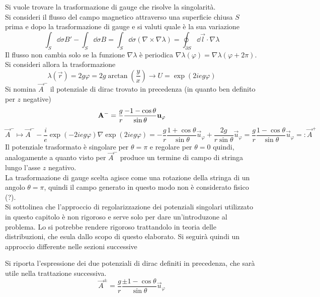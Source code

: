 Si vuole trovare la trasformazione di gauge che risolve la singolarità.\\

Si consideri il flusso del campo magnetico attraverso una superficie chiusa $S$
prima e dopo la trasformazione di gauge e si valuti quale è la sua variazione
$$
   \int_S \dd\sigma B' - \int_S \dd\sigma B = \int_S \dd\sigma (\nabla \times \nabla \lambda)
      = \oint_{\partial S} \dd\vec l \cdot \nabla \lambda
$$
Il flusso non cambia solo se la funzione $\nabla \lambda$ è periodica $\nabla
\lambda(\varphi) = \nabla \lambda( \varphi + 2\pi)$. Si consideri allora la trasformazione
$$
\lambda(\vec r) = 2g\varphi = 2g\arctan\left(\frac{y}{x}\right) \to U = \exp(2ieg\varphi)
$$
Si nomina $\vec A^-$ il potenziale di dirac trovato in precedenza (in quanto ben
definito per $z$ negative)
$$
   \vec A^- = \frac{g}{r}\frac{-1 - \cos\theta}{\sin\theta} \vec u _\varphi  \\
$$
$$
  \vec A ^- \mapsto \vec A ^- - \frac{i}{e} \exp( -2ieg\varphi )\nabla \exp(2ieg\varphi ) =
     -\frac{g}{r}\frac{1+\cos\theta}{\sin\theta}\vec u _\varphi
     + \frac{2g}{r\sin\theta}\vec u _\varphi
     = \frac{g}{r}\frac{1 - \cos\theta}{\sin\theta} \vec u _\varphi
     =: \vec A ^+
$$
Il potenziale trasformato è singolare per $\theta = \pi$ e regolare per
$\theta =  0$ quindi, analogamente a quanto visto per $\vec A^-$ produce un termine
di campo di stringa lungo l'asse $z$ negativo.\\
La trasformazione di gauge scelta agisce come una rotazione della stringa
di un angolo $\theta = \pi$, quindi il campo generato in questo modo non è
considerato fisico (?).\\

Si sottolinea che l'approccio di regolarizzazione dei potenziali singolari
utilizzato in questo capitolo è non rigoroso e serve solo per dare un'introduzone
al problema. Lo si potrebbe rendere rigoroso trattandolo in teoria delle
distribuzioni, che esula dallo scopo di questo elaborato. Si seguirà quindi
un approccio differente nelle sezioni successive

Si riporta l'espressione dei due potenziali di dirac definiti in precedenza, che
sarà utile nella trattazione successiva.
\begin{equation}\label{eq:localdiracpotential}
  \vec A^\pm = \frac{g}{r}\frac{\pm 1 - \cos\theta}{\sin\theta} \vec u _\varphi
\end{equation}


